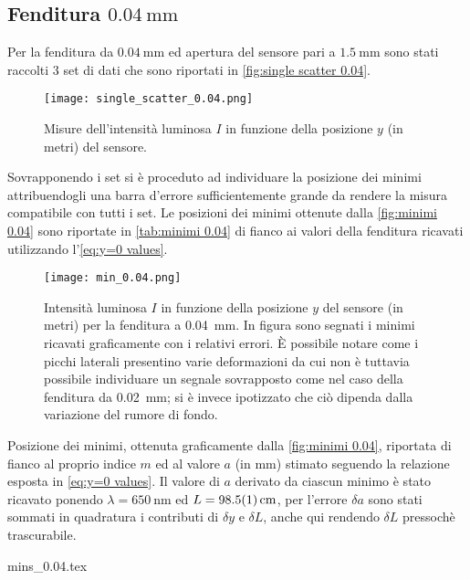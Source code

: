 \documentclass[../main.tex]{subfiles}
\begin{document}
\subsection{Fenditura $\qty{0.04}{\mm}$}

Per la fenditura da $\qty{0.04}{\mm}$ ed apertura del sensore pari a $\qty{1.5}{\mm}$ sono stati raccolti $3$ set di dati che sono riportati in \autoref{fig:single scatter 0.04}.

\begin{figure}[ht!]
    \centering
    \texttt{[image: single\_scatter\_0.04.png]}
    \caption{Misure dell'intensità luminosa $I$ in funzione della posizione $y$ (in metri) del sensore.} %
    \label{fig:single scatter 0.04}
\end{figure}

\newpage

Sovrapponendo i set si è proceduto ad individuare la posizione dei minimi attribuendogli una barra d'errore sufficientemente grande da rendere la misura compatibile con tutti i set. Le posizioni dei minimi ottenute dalla \autoref{fig:minimi 0.04} sono riportate in \autoref{tab:minimi 0.04} di fianco ai valori della fenditura ricavati utilizzando l'\autoref{eq:y=0 values}.

\begin{figure}[ht!]
    \centering
    \texttt{[image: min\_0.04.png]}
    \caption{Intensità luminosa $I$ in funzione della posizione $y$ del sensore (in metri) per la fenditura a \qty{0.04}{\mm}. In figura sono segnati i minimi ricavati graficamente con i relativi errori. È possibile notare come i picchi laterali presentino varie deformazioni da cui non è tuttavia possibile individuare un segnale sovrapposto come nel caso della fenditura da \qty{0.02}{\mm}; si è invece ipotizzato che ciò dipenda dalla variazione del rumore di fondo. %
    } %
    \label{fig:minimi 0.04}
\end{figure}

\begin{table}[ht!]
    \centering
    \caption{Posizione dei minimi, ottenuta graficamente dalla \autoref{fig:minimi 0.04}, riportata di fianco al proprio indice $m$ ed al valore $a$ (in $\si{\mm}$) stimato seguendo la relazione esposta in \autoref{eq:y=0 values}. Il valore di $a$ derivato da ciascun minimo è stato ricavato ponendo $\lambda = \qty{650}{\nm}$ ed $L = \qty{98.5+-0.1}{\cm}$, per l'errore $\delta a$ sono stati sommati in quadratura i contributi di $\delta y$ e $\delta L$, anche qui rendendo $\delta L$ pressochè trascurabile.}
    {mins_0.04.tex}
    \label{tab:minimi 0.04}
\end{table}
\end{document}
